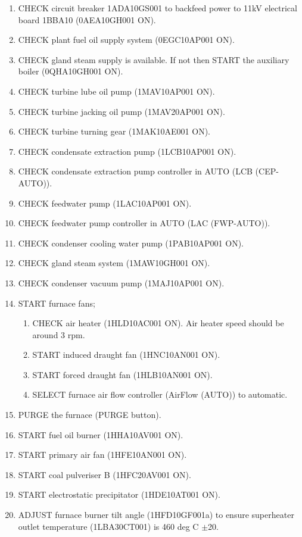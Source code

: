\documentclass[10pt,a4paper]{article}
\begin{document}
\begin{enumerate}
\item CHECK circuit breaker 1ADA10GS001 to backfeed power to 11kV electrical board 1BBA10 (0AEA10GH001 ON).
\item CHECK plant fuel oil supply system (0EGC10AP001 ON).
\item CHECK gland steam supply is available. If not then START the auxiliary boiler (0QHA10GH001 ON).
\item CHECK turbine lube oil pump (1MAV10AP001 ON).
\item CHECK turbine jacking oil pump (1MAV20AP001 ON).
\item CHECK turbine turning gear (1MAK10AE001 ON).
\item CHECK condensate extraction pump (1LCB10AP001 ON).
\item CHECK condensate extraction pump controller in AUTO (LCB (CEP-AUTO)). 
\item CHECK feedwater pump (1LAC10AP001 ON).
\item CHECK feedwater pump controller in AUTO (LAC (FWP-AUTO)). 
\item CHECK condenser cooling water pump (1PAB10AP001 ON).
\item CHECK gland steam system (1MAW10GH001 ON).
\item CHECK condenser vacuum pump (1MAJ10AP001 ON).
\item START furnace fans;
\begin{enumerate}
\item CHECK air heater (1HLD10AC001 ON). Air heater speed should be around 3 rpm.
\item START induced draught fan (1HNC10AN001 ON).
\item START forced draught fan (1HLB10AN001 ON).
\item SELECT furnace air flow controller (AirFlow (AUTO)) to automatic.
\end{enumerate}
\item PURGE the furnace (PURGE button).
\item START fuel oil burner (1HHA10AV001 ON). 
\item START primary air fan (1HFE10AN001 ON). 
\item START coal pulveriser B (1HFC20AV001 ON). 
\item START electrostatic precipitator (1HDE10AT001 ON). 
\item ADJUST furnace burner tilt angle (1HFD10GF001a) to ensure superheater outlet temperature (1LBA30CT001) is 460 deg C $\pm$20.

\end{enumerate}
\end{document}
